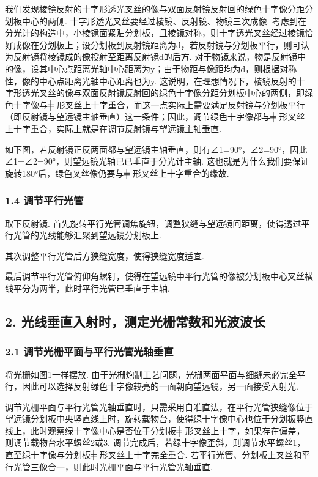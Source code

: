 \documentclass[UTF8]{ctexart}
\begin{document}
我们发现棱镜反射的十字形透光叉丝的像与双面反射镜反射回的绿色十字像分距分划板中心的两侧. 十字形透光叉丝要经过棱镜、反射镜、物镜三次成像. 考虑到在分光计的构造中，小棱镜面紧贴分划板，且棱镜对称，则十字透光叉丝经过棱镜恰好成像在分划板上；设分划板到反射镜距离为d，若反射镜与分划板平行，则可认为反射镜将棱镜成的像投射至距离反射镜d的后方. 对于物镜来说，物是反射镜中的像，设其中心点距离光轴中心距离为y；由于物距与像距均为d，则根据对称性，像的中心点距离光轴中心距离也为y. 这说明，在理想情况下，棱镜反射的十字形透光叉丝的像与双面反射镜反射回的绿色十字像分距分划板中心的两侧，即绿色十字像与╪ 形叉丝上十字重合，而这一点实际上需要满足反射镜与分划板平行（即反射镜与望远镜主轴垂直）这一条件；因此，调节绿色十字像都与╪ 形叉丝上十字重合，实际上就是在调节反射镜与望远镜主轴垂直.\par
如下图，若反射镜正反两面都与望远镜主轴垂直，则有∠1=90°，∠2=90°，因此∠1=∠2=90°，则望远镜光轴已已垂直于分光计主轴. 这也就是为什么我们要保证旋转180°后，绿色叉丝像仍要与╪ 形叉丝上十字重合的缘故.
\subsubsection*{1.4 调节平行光管}
取下反射镜. 首先旋转平行光管调焦旋钮，调整狭缝与望远镜间距离，使得透过平行光管的光线能够汇聚到望远镜分划板上.\par
其次调整平行光管后方狭缝宽度，使得狭缝宽度适宜.\par
最后调节平行光管俯仰角螺钉，使得在望远镜中平行光管的像被分划板中心叉丝横线平分为两半，此时平行光管已垂直于主轴.

\subsection*{ 2. 光线垂直入射时，测定光栅常数和光波波长}
\subsubsection*{2.1 调节光栅平面与平行光管光轴垂直}
将光栅如图1一样摆放. 由于光栅炮制工艺问题，光栅两面平面与细缝未必完全平行，因此可以选择反射绿色十字像较亮的一面朝向望远镜，另一面接受入射光.\par
调节光栅平面与平行光管光轴垂直时，只需采用自准直法，在平行光管狭缝像位于望远镜分划板中央竖直线上时，旋转载物台，使得绿十字像中心也位于分划板竖直线上，此时观察绿十字像中心是否位于分划板╪ 形叉丝上十字，如果存在偏差，则调节载物台水平螺丝2或3. 调节完成后，若绿十字像歪斜，则调节水平螺丝1，直至绿十字像与分划板╪ 形叉丝上十字完全重合. 若平行光管、分划板上叉丝和平行光管三像合一，则此时光栅平面与平行光管光轴垂直.
\end{document}
